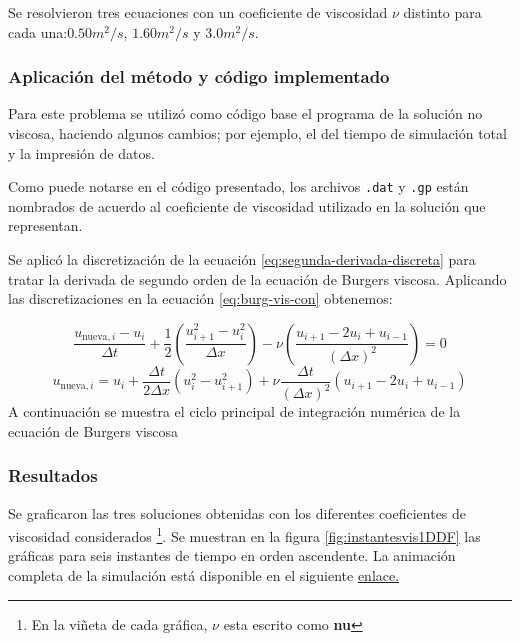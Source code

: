\documentclass[12pt]{article}
\begin{document}
	Se resolvieron tres ecuaciones con un coeficiente de viscosidad $\nu$ distinto para cada una:$0.50\unit{m^{2}\per s}$, $1.60\unit{m^{2}\per s}$ y $3.0\unit{m^{2}\per s}$.
	\subsubsection{Aplicación del método y código implementado}
	Para este problema se utilizó como código base el programa de la solución no viscosa, haciendo algunos cambios; por ejemplo, el del tiempo de simulación total y la impresión de datos.
	
	Como puede notarse en el código presentado, los archivos \texttt{.dat} y \texttt{.gp} están nombrados de acuerdo al coeficiente de viscosidad utilizado en la solución que representan.
	
	Se aplicó la discretización de la ecuación \ref{eq:segunda-derivada-discreta} para tratar la derivada de segundo orden de la ecuación de Burgers viscosa. Aplicando las discretizaciones en la ecuación \ref{eq:burg-vis-con} obtenemos:
	
	\begin{equation}
		\frac{u_{\text{nueva},i}-u_{i}}{\Delta t} +  \frac{1}{2} \left(\frac{u^{2}_{i+1}-u^{2}_{i}}{\Delta x}\right)  -  \nu \left( \frac{u_{i+1}-2u_{i}+u_{i-1}}{(\Delta x)^{2}} \right) =0
	\end{equation}
	\begin{equation}
		u_{\text{nueva},i} = u_{i} + \frac{\Delta t}{2 \Delta x} \left( u^{2}_{i}-u^{2}_{i+1} \right)  + \nu \frac{\Delta t}{(\Delta x)^2}\left( u_{i+1}-2u_{i}+u_{i-1} \right) 
	\end{equation}
	A continuación se muestra el ciclo principal de integración numérica de la ecuación de Burgers viscosa
	
	
	
	\subsubsection{Resultados}
	Se graficaron las tres soluciones obtenidas con los diferentes coeficientes de viscosidad considerados \footnote{En la viñeta de cada gráfica, $\nu$ esta escrito como \textbf{nu}}. Se muestran en la figura \ref{fig:instantesvis1DDF} las gráficas para seis instantes de tiempo en orden ascendente. La animación completa de la simulación está disponible en el siguiente \href{https://github.com/highchen147/practicas/blob/main/burg-vis1DDF/results/simulacion.mp4}{enlace.}
	
\end{document}
